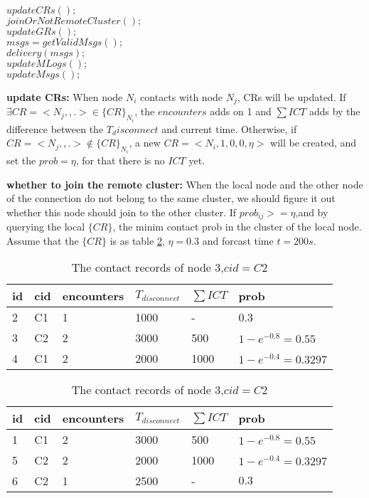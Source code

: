 \begin{algorithm}[!h]\label{algorithm_connecting}
\caption{algorithm when a connection is established}
\begin{algorithmic}
\STATE $updateCRs();$\\
\STATE $joinOrNotRemoteCluster();$\\
\ENDIF
\STATE $updateGRs();$\\
\STATE $msgs = getValidMsgs();$\\
\STATE $delivery(msgs);$\\
\STATE $updateMLogs();$\\
\STATE $updateMsgs();$\\
\end{algorithmic}
\end{algorithm}



\textbf{update CRs:} When node $N_i$ contacts with node $N_j$, CRs will be updated. If $\exists CR=<N_j,,.>\in \{CR\}_{N_i}$, the $encounters$ adds on 1 and $\sum ICT$ adds by the difference between the $T_disconnect$ and current time. Otherwise, if $CR=<N_j,,.>\notin \{CR\}_{N_i}$, a new $CR=<N_i,1,0,0,\eta>$ will be created, and set the $prob=\eta$, for that there is no $ICT$ yet.

\textbf{whether to join the remote cluster:} When the local node and the other node of the connection do not belong to the same cluster, we should figure it out whether this node should join to the other cluster. If $prob_{ij}>=\eta$,and by querying the local $\{CR\}$, the minim contact prob in the cluster of the local node. Assume that the $\{CR\}$ is as table \ref{table_crs}, $\eta=0.3$ and forcast time $t=200s$.
\begin{table}[!h]\label{table_crs}
\caption{The contact records of node1,$cid=C1$}
\begin{tabular}{l|l|l|l|l|l}
  \hline
  \textbf{id}&\textbf{cid}&\textbf{encounters}&\textbf{$T_{disconnect}$}&\textbf{$\sum ICT$}&\textbf{prob}\\
  \hline
  2 & C1 & 1 & 1000 & - & 0.3 \\
  3 & C2 & 2 & 3000 & 500 & $1-e^{-0.8}=0.55$\\
  4 & C1 & 2 & 2000 & 1000 & $1-e^{-0.4}=0.3297$ \\
  \hline
\end{tabular}
\caption{The contact records of node 3,$cid=C2$}
\begin{tabular}{l|l|l|l|l|l}
  \hline
  \textbf{id}&\textbf{cid}&\textbf{encounters}&\textbf{$T_{disconnect}$}&\textbf{$\sum ICT$}&\textbf{prob}\\
  \hline
  1 & C1 & 2 & 3000 & 500 & $1-e^{-0.8}=0.55$\\
  5 & C2 & 2 & 2000 & 1000 & $1-e^{-0.4}=0.3297$ \\
  6 & C2 & 1 & 2500 & - & $0.3$ \\
  \hline
\end{tabular}
\end{table}

